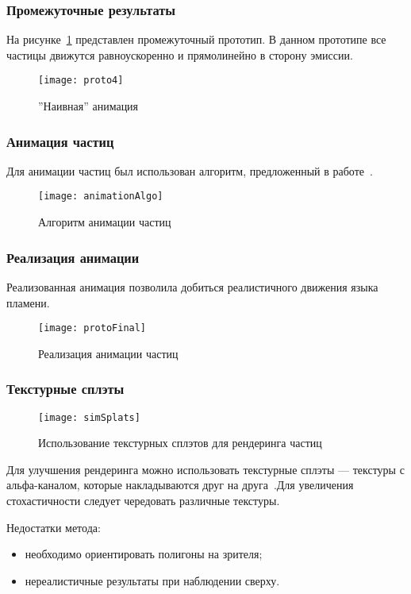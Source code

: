 \begin{frame}
\frametitle{Промежуточные результаты}
На рисунке~\ref{fig:proto4} представлен промежуточный прототип. В данном
прототипе все частицы движутся равноускоренно и прямолинейно в сторону эмиссии.
\begin{figure}[htb]
	\centering
    \texttt{[image: proto4]}
    \caption{''Наивная'' анимация}%
    \label{fig:proto4}
\end{figure}
\end{frame}

\begin{frame}
\frametitle{Анимация частиц}
Для анимации частиц был использован алгоритм, предложенный
в работе~\cite{Somasekaran2005UsingPS}.
\begin{figure}[htb]
	\centering
    \texttt{[image: animationAlgo]}
    \caption{Алгоритм анимации частиц}%
    \label{fig:animationAlgo}
\end{figure}
\end{frame}

\begin{frame}
\frametitle{Реализация анимации}
Реализованная анимация позволила добиться реалистичного движения языка пламени.
\begin{figure}[htb]
	\centering
    \texttt{[image: protoFinal]}
    \caption{Реализация анимации частиц}%
    \label{fig:protoFinal}
\end{figure}
\end{frame}

\begin{frame}[t]
\frametitle{Текстурные сплэты}
\begin{wrapfigure}{r}{0.3\textwidth}
	\centering
    \texttt{[image: simSplats]}
    \caption{Использование текстурных сплэтов для рендеринга частиц}%
    \label{fig:protoSplats}
\end{wrapfigure}
Для улучшения рендеринга можно использовать текстурные сплэты --- текстуры с
альфа-каналом, которые накладываются друг на друга~\cite{FireSplats}.Для
увеличения стохастичности следует чередовать различные текстуры.

Недостатки метода:
\begin{itemize}
    \item необходимо ориентировать полигоны на зрителя;
    \item нереалистичные результаты при наблюдении сверху.
\end{itemize}
\end{frame}

